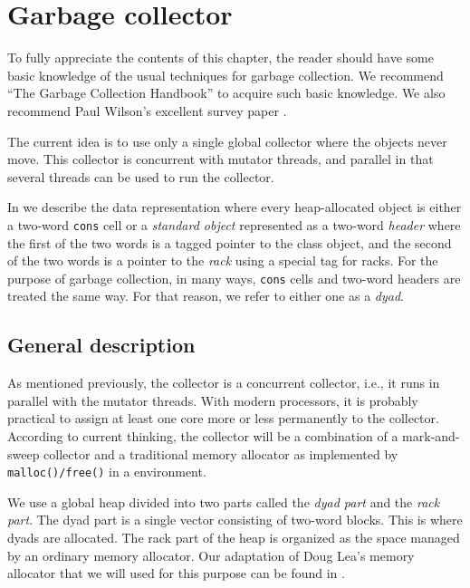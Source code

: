 \chapter{Garbage collector}
\label{chap-garbage-collector}

To fully appreciate the contents of this chapter, the reader should
have some basic knowledge of the usual techniques for garbage
collection.  We recommend ``The Garbage Collection Handbook''
\cite{Jones:2011:GCH:2025255} to acquire such basic knowledge.  We
also recommend Paul Wilson's excellent survey paper
\cite{Wilson:1992:UGC:645648.664824}.

The current idea is to use only a single global collector where the
objects never move.  This collector is concurrent with mutator
threads, and parallel in that several threads can be used to run the
collector.

In  we describe the data
representation where every heap-allocated object is either a two-word
\texttt{cons} cell or a \emph{standard object} represented as a
two-word \emph{header} where the first of the two words is a tagged
pointer to the class object, and the second of the two words is a
pointer to the \emph{rack} using a special tag for racks.  For the
purpose of garbage collection, in many ways, \texttt{cons} cells and
two-word headers are treated the same way.  For that reason, we refer
to either one as a \emph{dyad}.

\section{General description}

As mentioned previously, the collector is a concurrent collector,
i.e., it runs in parallel with the mutator threads.  With modern
processors, it is probably practical to assign at least one core more
or less permanently to the collector.  According to current
thinking, the collector will be a combination of a
mark-and-sweep collector and a traditional memory allocator as
implemented by \texttt{malloc()/free()} in a \clanguage{} environment.

We use a global heap divided into two parts called the \emph{dyad
  part} and the \emph{rack part}.  The dyad part is a single vector
consisting of two-word blocks.  This is where dyads are allocated.
The rack part of the heap is organized as the space managed by
an ordinary memory allocator.  Our adaptation of Doug Lea's memory
allocator that we will used for this purpose can be found in
.

